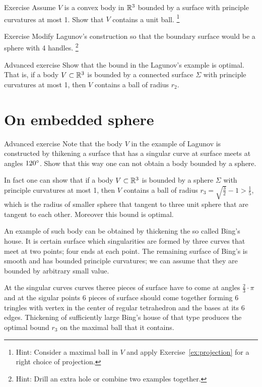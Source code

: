 \begin{thm}{Exercise}
Assume $V$ is a convex body in $\mathbb{R}^3$ bounded by a surface with principle curvatures at most 1.
Show that $V$ contains a unit ball.%
\footnote{Hint: Consider a maximal ball in $V$ and apply Exercise~\ref{ex:projection} for a right choice of projection.}
\end{thm}





\begin{thm}{Exercise}
Modify Lagunov's construction so that the boundary surface would be a sphere with 4 handles.%
\footnote{Hint: Drill an extra hole or combine two examples together.}
\end{thm}



\begin{thm}{Advanced exercise}
Show that the bound in the Lagunov's example is optimal.
That is, if a body $V\subset \mathbb{R}^3$ is bounded by a connected surface  $\Sigma$ with principle curvatures at most 1, then $V$ contains a ball of radius $r_2$.
\end{thm}

\section{On embedded sphere}


\begin{thm}{Advanced exercise}
Note that the body $V$ in the example of Lagunov is constructed by thikening a surface that has a singular curve at surface meets at angles $120\degree$.
Show that this way one can not obtain a body bounded by a sphere.
\end{thm}

In fact one can show that if a body $V\subset \mathbb{R}^3$ is bounded by a sphere $\Sigma$ with principle curvatures at most 1, then $V$ contains a ball of radius $r_3=\sqrt{\tfrac32}-1>\tfrac15$,
which is the radius of smaller sphere that tangent to three unit sphere that are tangent to each other.
Moreover this bound is optimal.

An example of such body can be obtained by thickening the so called Bing's house.
It is certain surface which singularities are formed by three curves that meet at two points;
four ends at each point.
The remaining surface of Bing's is smooth and has bounded principle curvatures;
we can assume that they are bounded by arbitrary small value.

At the singular curves curves theree pieces of surface have to come at angles $\tfrac23\cdot\pi$ and at the sigular points 6 pieces of surface should come together forming 6 tringles with vertex in the center of regular tetrahedron and the bases at its 6 edges.
Thickening of sufficiently large Bing's house of that type produces the optimal bound $r_3$ on the maximal ball that it contains.

